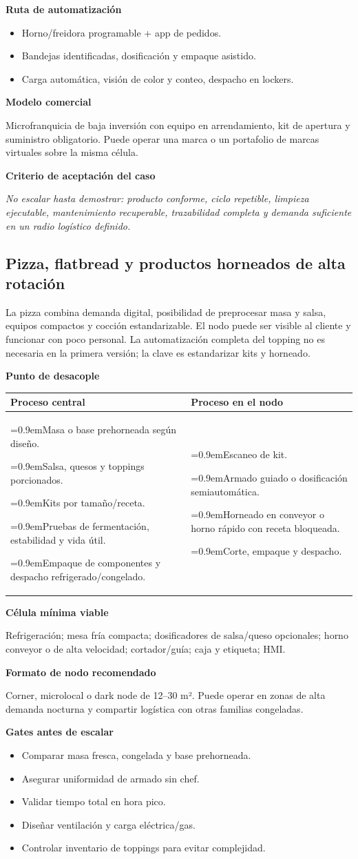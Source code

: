 \documentclass[11pt,a4paper]{article}
\makeatletter
\newcommand{\etiqueta}[1]{\par\medskip\noindent\textbf{#1}\par\nopagebreak\smallskip}
\newcommand{\ti}{\par\hangindent=0.9em\hangafter=1\noindent\makebox[0.9em][l]{\textbullet}}
\newcommand{\desacople}[2]{\etiqueta{Punto de desacople}
  {\small\noindent\begin{tabularx}{\textwidth}{@{}>{\raggedright\arraybackslash}X>{\raggedright\arraybackslash}X@{}}
  \toprule \textbf{Proceso central} & \textbf{Proceso en el nodo}\\ \midrule
  #1 & #2\\ \bottomrule\end{tabularx}}\par}
\newcommand{\rutas}[3]{\etiqueta{Ruta de automatización}
  \begin{itemize}[leftmargin=2.6em,labelwidth=2em]
  \item[\textbf{1.0}] #1
  \item[\textbf{2.0}] #2
  \item[\textbf{3.0}] #3
  \end{itemize}}
\newcommand{\criterio}{\etiqueta{Criterio de aceptación del caso}
  \noindent\textit{No escalar hasta demostrar: producto conforme, ciclo repetible, limpieza ejecutable,
  mantenimiento recuperable, trazabilidad completa y demanda suficiente en un radio logístico definido.}\par}
\makeatother
\begin{document}
\rutas{Horno/freidora programable + app de pedidos.}
{Bandejas identificadas, dosificación y empaque asistido.}
{Carga automática, visión de color y conteo, despacho en lockers.}

\etiqueta{Modelo comercial}
Microfranquicia de baja inversión con equipo en arrendamiento, kit de apertura y suministro obligatorio.
Puede operar una marca o un portafolio de marcas virtuales sobre la misma célula.

\criterio

\subsection{Pizza, flatbread y productos horneados de alta rotación}
La pizza combina demanda digital, posibilidad de preprocesar masa y salsa, equipos compactos y cocción
estandarizable. El nodo puede ser visible al cliente y funcionar con poco personal. La automatización
completa del topping no es necesaria en la primera versión; la clave es estandarizar kits y horneado.

\desacople{%
\ti Masa o base prehorneada según diseño.
\ti Salsa, quesos y toppings porcionados.
\ti Kits por tamaño/receta.
\ti Pruebas de fermentación, estabilidad y vida útil.
\ti Empaque de componentes y despacho refrigerado/congelado.}{%
\ti Escaneo de kit.
\ti Armado guiado o dosificación semiautomática.
\ti Horneado en conveyor o horno rápido con receta bloqueada.
\ti Corte, empaque y despacho.}

\etiqueta{Célula mínima viable}
Refrigeración; mesa fría compacta; dosificadores de salsa/queso opcionales; horno conveyor o de alta
velocidad; cortador/guía; caja y etiqueta; HMI.

\etiqueta{Formato de nodo recomendado}
Corner, microlocal o dark node de 12--30 m². Puede operar en zonas de alta demanda nocturna y compartir
logística con otras familias congeladas.

\etiqueta{Gates antes de escalar}
\begin{itemize}
\item Comparar masa fresca, congelada y base prehorneada.
\item Asegurar uniformidad de armado sin chef.
\item Validar tiempo total en hora pico.
\item Diseñar ventilación y carga eléctrica/gas.
\item Controlar inventario de toppings para evitar complejidad.
\end{itemize}
\end{document}
